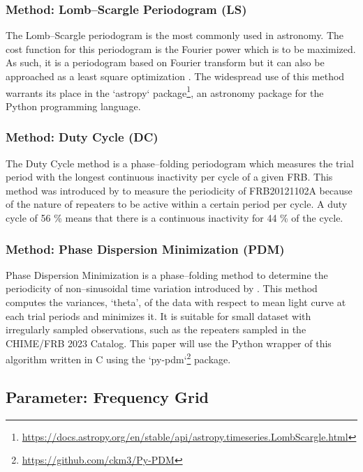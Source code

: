 \documentclass[reprint,amsmath,amssymb,showkeys,prd]{revtex4-2}
\begin{document}
\subsubsection{Method: Lomb--Scargle Periodogram (LS)}

The Lomb--Scargle periodogram \citet{lomb_LeastSquaresFrequencyAnalysis_1976, scargle_StudiesAstronomicalTime_1982} is the most commonly used in astronomy.
The cost function for this periodogram is the Fourier power which is to be maximized.
As such, it is a periodogram based on Fourier transform but it can also be approached as a least square optimization  \cite{vanderplas_UnderstandingLombScargle_2018} .
The widespread use of this method warrants its place in the `astropy` package\footnote{\url{https://docs.astropy.org/en/stable/api/astropy.timeseries.LombScargle.html}}, an astronomy package for the Python programming language.

\subsubsection{Method: Duty Cycle (DC)}

The Duty Cycle method is a phase--folding periodogram which measures the trial period with the longest continuous inactivity per cycle of a given FRB.
This method was introduced by \citet{rajwade_PossiblePeriodicActivity_2020} to measure the periodicity of FRB20121102A because of the nature of repeaters to be active within a certain period per cycle.
A duty cycle of 56 \% means that there is a continuous inactivity for 44 \% of the cycle.

\subsubsection{Method: Phase Dispersion Minimization (PDM)}

Phase Dispersion Minimization is a phase--folding method to determine the periodicity of non--sinusoidal time variation introduced by \citet{stellingwerf_PeriodDeterminationUsing_1978}. 
This method computes the variances, `theta', of the data with respect to mean light curve at each trial periods and minimizes it.
It is suitable for small dataset with irregularly sampled observations, such as the repeaters sampled in the CHIME/FRB 2023 Catalog.
This paper will use the Python wrapper of this algorithm written in C using the `py-pdm`\footnote{\url{https://github.com/ckm3/Py-PDM}} package.

\subsection{Parameter: Frequency Grid}
\end{document}
